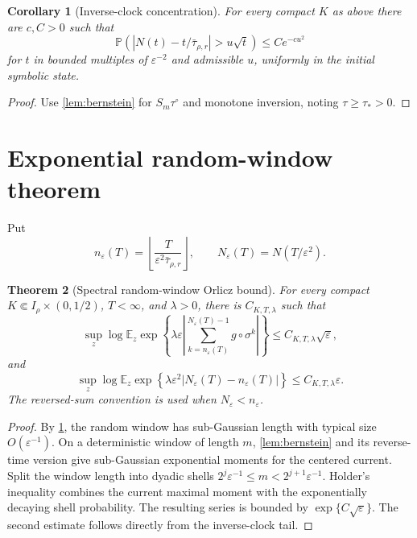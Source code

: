 \documentclass[11pt,reqno]{amsart}
\newtheorem{theorem}{Theorem}[section]
\newtheorem{corollary}[theorem]{Corollary}
\theoremstyle{definition}
\theoremstyle{remark}
\newcommand{\E}{\mathbb E}
\newcommand{\Pp}{\mathbb P}
\newcommand{\abs}[1]{\left\lvert #1\right\rvert}
\begin{document}
\begin{corollary}[Inverse-clock concentration]\label{cor:clock}
For every compact $K$ as above there are $c,C>0$ such that
\[
 \Pp\left(
 \abs{N(t)-t/\bar\tau_{\rho,r}}>u\sqrt t
 \right)\le Ce^{-cu^2}
\]
for $t$ in bounded multiples of $\varepsilon^{-2}$ and admissible $u$, uniformly in the initial symbolic state.
\end{corollary}
\begin{proof}
Use \cref{lem:bernstein} for $S_m\tau^\circ$ and monotone inversion, noting
$\tau\ge\tau_*>0$.
\end{proof}

\section{Exponential random-window theorem}\label{sec:window}
Put
\[
 n_\varepsilon(T)=\left\lfloor
 \frac{T}{\varepsilon^2\bar\tau_{\rho,r}}\right\rfloor,
 \qquad
 N_\varepsilon(T)=N(T/\varepsilon^2).
\]

\begin{theorem}[Spectral random-window Orlicz bound]\label{thm:window}
For every compact $K\Subset I_\rho\times(0,1/2)$, $T<\infty$, and
$\lambda>0$, there is $C_{K,T,\lambda}$ such that
\[
 \sup_z\log\E_z\exp\left\{
 \lambda\varepsilon
 \abs{\sum_{k=n_\varepsilon(T)}^{N_\varepsilon(T)-1}
 g\circ\sigma^k}
 \right\}
 \le C_{K,T,\lambda}\sqrt\varepsilon,
\]
and
\[
 \sup_z\log\E_z\exp\left\{
 \lambda\varepsilon^2
 \abs{N_\varepsilon(T)-n_\varepsilon(T)}
 \right\}
 \le C_{K,T,\lambda}\varepsilon.
\]
The reversed-sum convention is used when $N_\varepsilon<n_\varepsilon$.
\end{theorem}
\begin{proof}
By \cref{cor:clock}, the random window has sub-Gaussian length with typical
size $O(\varepsilon^{-1})$.  On a deterministic window of length $m$,
\cref{lem:bernstein} and its reverse-time version give sub-Gaussian exponential
moments for the centered current.  Split the window length into dyadic shells
$2^j\varepsilon^{-1}\le m<2^{j+1}\varepsilon^{-1}$.  Holder's inequality
combines the current maximal moment with the exponentially decaying shell
probability.  The resulting series is bounded by
$\exp\{C\sqrt\varepsilon\}$.  The second estimate follows directly from the
inverse-clock tail.
\end{proof}
\end{document}
